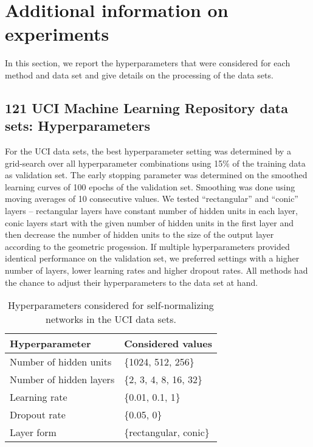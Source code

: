 \documentclass{article}
\begin{document}
\section{Additional information on experiments}
\label{sec:experiments} 
In this section, we report the hyperparameters that were considered for each method and
data set and give details on the processing of the data sets.

\subsection{121 UCI Machine Learning Repository data sets: Hyperparameters} 
For the UCI data sets, the best hyperparameter setting was determined by a grid-search over all
hyperparameter combinations using 15\% of the training data as validation set.
The early stopping parameter was determined on the smoothed learning curves of 100 epochs
of the validation set. Smoothing was done using moving averages of 10 consecutive 
values. We tested ``rectangular'' and ``conic'' layers -- rectangular layers have 
constant number of hidden units in each layer, conic layers start with the given 
number of hidden units in the first layer and then decrease the number of hidden units
to the size of the output layer according to the geometric progession.
If multiple hyperparameters provided identical performance on the validation 
set, we preferred settings with a higher number of layers, lower learning rates and higher dropout rates. 
All methods had the chance to adjust their hyperparameters to the data set at hand. 


\begin{table}[htp]
\begin{center}
\caption{Hyperparameters considered for self-normalizing networks in the UCI data sets.}

\begin{tabular}{ll}
\toprule
Hyperparameter  & Considered values \\ 
\midrule
  Number of hidden units & \{1024, 512, 256\} \\
  Number of hidden layers & \{2, 3, 4, 8, 16, 32\} \\
  Learning rate & \{0.01, 0.1, 1\} \\
  Dropout rate & \{0.05, 0\}\\
  Layer form & \{rectangular, conic\} \\
\bottomrule
\end{tabular}
\end{center}

\end{table}
\end{document}
